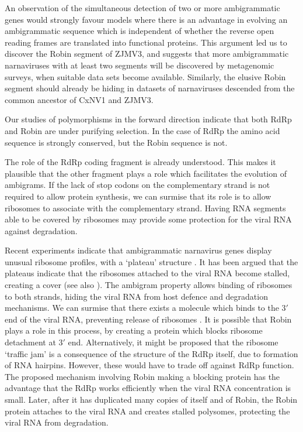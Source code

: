 \documentclass[unnumsec,webpdf,contemporary,large]{oup-authoring-template}%
\theoremstyle{thmstyleone}%
\theoremstyle{thmstyletwo}%
\theoremstyle{thmstylethree}%
\begin{document}
An observation of the simultaneous detection of two or more ambigrammatic genes would
strongly favour models where there is an advantage in evolving an
ambigrammatic sequence which is independent of whether the reverse open reading
frames are translated into functional proteins. This argument led us to discover the Robin segment
of ZJMV3, and suggests that more ambigrammatic narnaviruses with at least two segments will be discovered
by metagenomic surveys, when suitable data sets become available.
Similarly, the elusive Robin segment should already be hiding in datasets of narnaviruses descended from the common ancestor of CxNV1 and ZJMV3.


Our studies of polymorphisms in the forward direction indicate that both RdRp and Robin are under purifying selection.
In the case of RdRp the amino acid sequence is strongly conserved,
but the Robin sequence is not.

The role of the RdRp coding fragment
is already understood. This makes it plausible that the other fragment plays a role which facilitates the
evolution of ambigrams. If the lack of stop codons on the complementary strand is not required
to allow protein synthesis, we can surmise that its role is to allow ribosomes to associate with the
complementary strand. Having RNA segments able to be covered by ribosomes may provide some protection
for the viral RNA against degradation.

Recent experiments indicate that ambigrammatic narnavirus genes display unusual ribosome
profiles, with a \lq plateau' structure \citep{Ret+20}. It has been argued \citep{Wil+21} that the plateaus
indicate that the ribosomes attached to the viral RNA become stalled, creating a cover (see also
\cite{Cep20}). The ambigram property allows binding of ribosomes to both strands, hiding the viral
RNA from host defence and degradation mechanisms. We can surmise that there exists a molecule
which binds to the $3'$ end of the viral RNA, preventing release of ribosomes \citep{Wil+21}. It is possible
that Robin plays a role in this process, by creating a protein which blocks ribosome detachment at $3'$ end.
Alternatively, it might be proposed that the ribosome \lq traffic jam' is a consequence of the structure of the
RdRp itself, due to formation of RNA hairpins. However, these would have to trade off against RdRp function.
The proposed mechanism involving Robin making a blocking protein
has the advantage that the RdRp works efficiently when the viral RNA concentration is small.
Later, after it has duplicated many copies of itself and of Robin, the Robin protein attaches
to the viral RNA and creates stalled polysomes, protecting the viral RNA from degradation.
\end{document}
